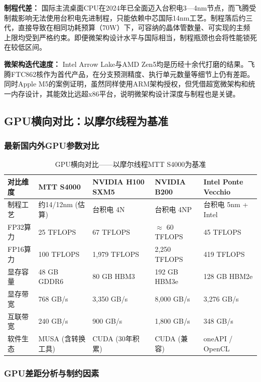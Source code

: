 \documentclass[a4paper]{article}
\begin{document}
\textbf{制程代差：} 国际主流桌面CPU在2024年已全面迈入台积电3—4nm节点，而飞腾受制裁影响无法使用台积电先进制程，只能依赖中芯国际14nm工艺。制程落后约三代，直接导致在相同功耗预算（70W）下，可容纳的晶体管数量、可实现的主频上限均受到严格约束。即便微架构设计水平与国际相当，制程瓶颈也会将性能锁死在较低区间。

\textbf{微架构迭代速度：} Intel Arrow Lake与AMD Zen5均是历经十余代打磨的结果。飞腾FTC862核作为首代产品，在分支预测精度、执行单元数量等细节上仍有差距。同时Apple M5的案例证明，虽然同样使用ARM架构授权，但凭借超宽微架构和统一内存设计，其能效比远超x86平台，说明微架构设计深度与制程也是关键。

\subsection{GPU横向对比：以摩尔线程为基准}

\subsubsection{最新国内外GPU参数对比}

\begin{table}[H]
\centering
\caption{GPU横向对比——以摩尔线程MTT S4000为基准}
\small
\begin{tabularx}{\textwidth}{lXXXX}
\toprule
\textbf{对比维度} & \textbf{MTT S4000} & \textbf{NVIDIA H100 SXM5} & \textbf{NVIDIA B200} & \textbf{Intel Ponte Vecchio} \\
\midrule
制程工艺 & 约14/12nm (估算) & 台积电 4N & 台积电 4NP & 台积电 5nm + Intel \\
FP32算力 & 25 TFLOPS & 67 TFLOPS & $\approx$ 60 TFLOPS & 45 TFLOPS \\
FP16算力 & 100 TFLOPS & 1,979 TFLOPS & 2,250 TFLOPS & 419 TFLOPS \\
显存容量 & 48 GB GDDR6 & 80 GB HBM3 & 192 GB HBM3e & 128 GB HBM2e \\
显存带宽 & 768 GB/s & 3,350 GB/s & 8,000 GB/s & 3,276 GB/s \\
互联带宽 & 240 GB/s & 900 GB/s & 1,800 GB/s & 348 GB/s \\
软件生态 & MUSA (含转换工具) & CUDA (30年积累) & CUDA (兼容) & oneAPI / OpenCL \\
\bottomrule
\end{tabularx}
\end{table}

\subsubsection{GPU差距分析与制约因素}
\end{document}
